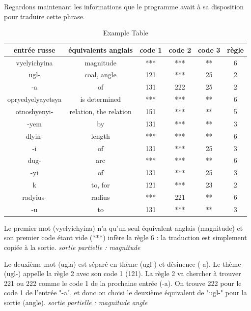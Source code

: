 \documentclass[11pt, a4paper]{report}
\begin{document}
Regardons maintenant les informations que le programme avait à sa disposition pour traduire 
cette phrase. 

\begin{table}[h] %
  \centering %
  \begin{tabular}{|c|c|c|c|c|c|} %
    \hline %
    entrée russe & équivalents anglais & code 1 & code 2 & code 3 & règle \\ %
    \hline
    vyelyichyina & magnitude & *** & *** & ** & 6 \\
    \hline
    ugl- & coal, angle & 121 & *** & 25 & 2 \\
    \hline 
    -a & of & 131 & 222 & 25 & 2 \\
    \hline 
    opryedyelyayetsya & is determined & *** & *** & ** & 6 \\
    \hline 
    otnoshyenyi- & relation, the relation & 151 & *** & ** & 5 \\ 
    \hline 
    -yem & by & 131 & *** & ** & 3 \\ 
    \hline 
    dlyin- & length & *** & *** & ** & 6 \\ 
    \hline 
    -i & of & 131 & *** & 25 & 3 \\ 
    \hline 
    dug- & arc & *** & *** & ** & 6 \\
    \hline 
    -yi & of & 131 & *** & 25 & 3 \\ 
    \hline 
    k & to, for & 121 & *** & 23 & 2 \\ 
    \hline 
    radyius- & radius & *** & 221 & ** & 6 \\ 
    \hline 
    -u & to & 131 & *** & ** & 3 \\
    \hline
  \end{tabular}
  \caption{Example Table} %
  \label{tab:example} %
\end{table}

Le premier mot (vyelyichyina) n'a qu'un seul équivalent anglais (magnitude) et son 
premier code étant vide (***) infère la règle 6 : la traduction est simplement copiée 
à la sortie. \newline 
\textit{sortie partielle : magnitude} 

Le deuxième mot (ugla) est séparé en thème (ugl-) et désinence (-a). 
Le thème (ugl-) appelle la règle 2 avec son code 1 (121). La règle 2 va chercher à trouver 221 ou 222 
comme le code 1 de la prochaine entrée (-a). On trouve 222 pour le code 1 de l'entrée 
"-a", et donc on choisi le deuxième équivalent de "ugl-" pour la sortie (angle). \newline 
\textit{sortie partielle : magnitude angle}
\end{document}
